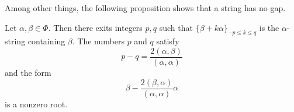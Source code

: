 Among other things, the following proposition shows that a string has no gap.
\begin{proposition}     \label{Proppqasbabaa}
	Let \( \alpha,\beta\in\Phi\). Then there exits integers \( p,q\) such that \( \{ \beta+k\alpha \}_{-p\leq k\leq q} \) is the \( \alpha\)-string containing \( \beta\). The numbers \( p\) and \( q\) satisfy
	\begin{equation}        \label{Eq2qbaaapmq}
		p-q=\frac{ 2(\alpha,\beta) }{ (\alpha,\alpha) }
	\end{equation}
	and the form
	\begin{equation}
		\beta-\frac{ 2(\beta,\alpha) }{ (\alpha,\alpha) }\alpha
	\end{equation}
	is a nonzero root.
\end{proposition}

